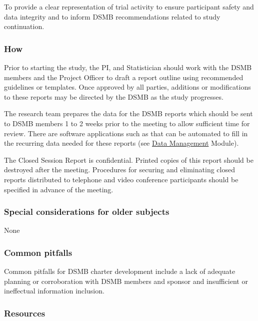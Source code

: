 \documentclass[]{book}
\theoremstyle{definition}
\theoremstyle{definition}
\theoremstyle{definition}
\theoremstyle{remark}
\begin{document}
To provide a clear representation of trial activity to ensure
participant safety and data integrity and to inform DSMB recommendations
related to study continuation.

\subsubsection{How}\label{how-15}

Prior to starting the study, the PI, and Statistician should work with
the DSMB members and the Project Officer to draft a report outline using
recommended guidelines or templates. Once approved by all parties,
additions or modifications to these reports may be directed by the DSMB
as the study progresses.

The research team prepares the data for the DSMB reports which should be
sent to DSMB members 1 to 2 weeks prior to the meeting to allow
sufficient time for review. There are software applications such as that
can be automated to fill in the recurring data needed for these reports
(see \href{https://ifar-isac.github.io/book/data-management.html}{Data
Management} Module).

The Closed Session Report is confidential. Printed copies of this report
should be destroyed after the meeting. Procedures for securing and
eliminating closed reports distributed to telephone and video conference
participants should be specified in advance of the meeting.

\subsubsection{Special considerations for older
subjects}\label{special-considerations-for-older-subjects-10}

None

\subsubsection{Common pitfalls}\label{common-pitfalls-13}

Common pitfalls for DSMB charter development include a lack of adequate
planning or corroboration with DSMB members and sponsor and insufficient
or ineffectual information inclusion.

\subsubsection{Resources}\label{resources-15}
\end{document}
